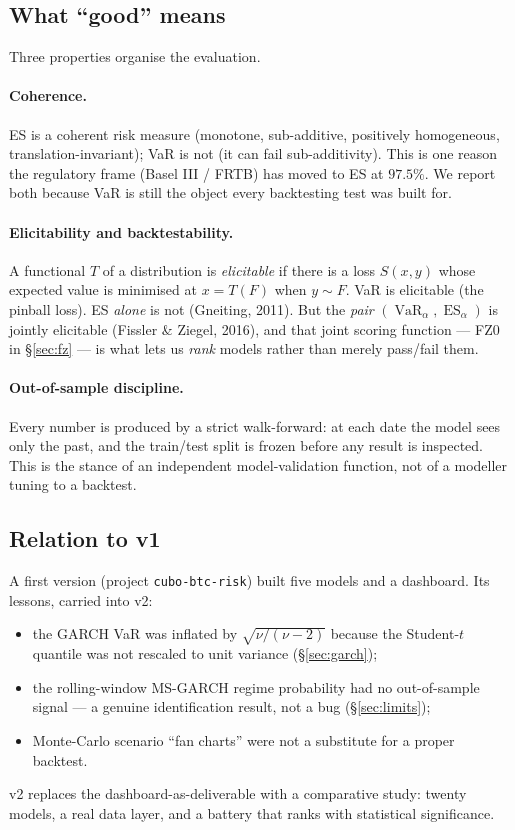 \documentclass[11pt,a4paper]{article}
\newcommand{\VaR}{\operatorname{VaR}}
\newcommand{\ES}{\operatorname{ES}}
\begin{document}
\subsection{What ``good'' means}

Three properties organise the evaluation.

\paragraph{Coherence.} ES is a coherent risk measure (monotone, sub-additive,
positively homogeneous, translation-invariant); VaR is not (it can fail
sub-additivity). This is one reason the regulatory frame (Basel III / FRTB) has
moved to ES at $97.5\%$. We report both because VaR is still the object every
backtesting test was built for.

\paragraph{Elicitability and backtestability.} A functional $T$ of a
distribution is \emph{elicitable} if there is a loss $S(x,y)$ whose expected
value is minimised at $x = T(F)$ when $y\sim F$. VaR is elicitable (the pinball
loss). ES \emph{alone} is not (Gneiting, 2011). But the \emph{pair}
$(\VaR_\alpha,\ES_\alpha)$ is jointly elicitable (Fissler \& Ziegel, 2016), and
that joint scoring function --- FZ0 in \S\ref{sec:fz} --- is what lets us
\emph{rank} models rather than merely pass/fail them.

\paragraph{Out-of-sample discipline.} Every number is produced by a strict
walk-forward: at each date the model sees only the past, and the train/test
split is frozen before any result is inspected. This is the stance of an
independent model-validation function, not of a modeller tuning to a backtest.

\subsection{Relation to v1}

A first version (project \texttt{cubo-btc-risk}) built five models and a
dashboard. Its lessons, carried into v2:
\begin{itemize}[nosep]
\item the GARCH VaR was inflated by $\sqrt{\nu/(\nu-2)}$ because the Student-$t$
      quantile was not rescaled to unit variance (\S\ref{sec:garch});
\item the rolling-window MS-GARCH regime probability had no out-of-sample
      signal --- a genuine identification result, not a bug (\S\ref{sec:limits});
\item Monte-Carlo scenario ``fan charts'' were not a substitute for a proper
      backtest.
\end{itemize}
v2 replaces the dashboard-as-deliverable with a comparative study: twenty
models, a real data layer, and a battery that ranks with statistical
significance.
\end{document}
